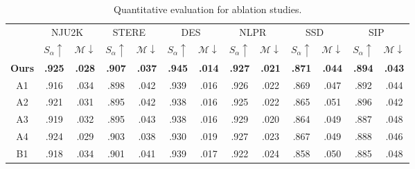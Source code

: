 \documentclass[10pt,twocolumn,letterpaper]{article}
\begin{document}
\begin{table}[t!]
  \centering
  \renewcommand{\arraystretch}{1.2}
  \renewcommand{\tabcolsep}{0.3mm}
  \caption{Quantitative evaluation for ablation studies.
  } 

  \scriptsize
  \begin{tabular}{c|cc|cc|cc|cc|cc|cc}
  \hline\toprule

    &\multicolumn{2}{c|}{NJU2K~\cite{ju2014depth}}
    &\multicolumn{2}{c|}{STERE~\cite{niu2012leveraging}}
    &\multicolumn{2}{c|}{DES~\cite{cheng2014depth}}
    &\multicolumn{2}{c|}{NLPR~\cite{peng2014rgbd}}
    &\multicolumn{2}{c|}{SSD~\cite{zhu2017three}}
    &\multicolumn{2}{c}{SIP~\cite{fan2019rethinking}}\\


    &$S_{\alpha}\uparrow$   &$\mathcal{M}\downarrow$
    &$S_{\alpha}\uparrow$    &$\mathcal{M}\downarrow$
    &$S_{\alpha}\uparrow$    &$\mathcal{M}\downarrow$
    &$S_{\alpha}\uparrow$    &$\mathcal{M}\downarrow$
    &$S_{\alpha}\uparrow$    &$\mathcal{M}\downarrow$
    &$S_{\alpha}\uparrow$    &$\mathcal{M}\downarrow$ \\


  \midrule
    \textbf{Ours}
    & \textbf{.925}   & \textbf{.028}
    & \textbf{.907}   & \textbf{.037}
    & \textbf{.945}   & \textbf{.014}
    & \textbf{.927}   & \textbf{.021}
    & \textbf{.871}   & \textbf{.044}
    & \textbf{.894}   & \textbf{.043} 	\\

   \midrule

    A1
    & .916   & .034
    & .898   & .042
    & .939   & .016
    & .926   & .022
    & .869   & .047
    & .892   & .044 	\\

    A2
    & .921   & .031
    & .895   & .042
    & .938   & .016
    & .925   & .022
    & .865   & .051
    & .896   & .042 	\\

    A3
    & .919   & .032
    & .895   & .043
    & .938   & .016
    & .929   & .020
    & .864   & .049
    & .887   & .048 	\\

    A4
    & .924   & .029
    & .903   & .038
    & .930   & .019
    & .927   & .023
    & .867   & .049
    & .888   & .046 	\\


    \midrule

    B1
    & .918   & .034
    & .901   & .041
    & .939   & .017
    & .922   & .024
    & .858   & .050
    & .885   & .048 	\\


\end{tabular}
\end{table}
\end{document}
